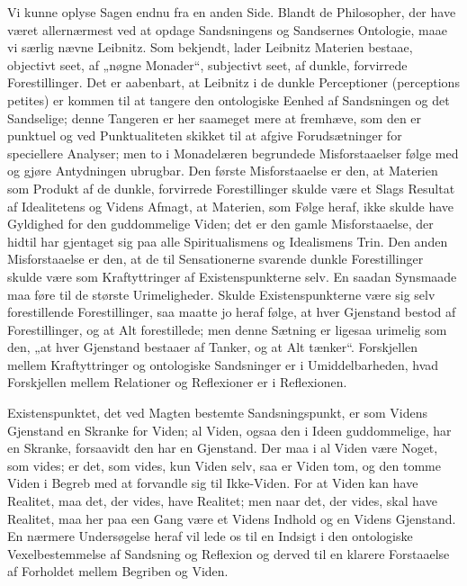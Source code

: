 \documentclass[12pt]{book}
\newcommand{\opage}[1]{\marginnote{\footnotesize\textit{[#1]}}}
\begin{document}
Vi kunne oplyse Sagen endnu fra en anden Side. Blandt de Philosopher, der have været allernærmest ved
at
\opage{259} opdage Sandsningens og Sandsernes Ontologie, maae vi særlig nævne Leibnitz. Som bekjendt, lader
Leibnitz Materien bestaae, objectivt seet, af „nøgne Monader“, subjectivt seet, af dunkle, forvirrede
Forestillinger. Det er aabenbart, at Leibnitz i de dunkle Perceptioner (perceptions petites) er kommen
til at tangere den ontologiske Eenhed af Sandsningen og det Sandselige; denne Tangeren er her saameget
mere at fremhæve, som den er punktuel og ved Punktualiteten skikket til at afgive Forudsætninger for
speciellere Analyser; men to i Monadelæren begrundede Misforstaaelser følge med og gjøre Antydningen
ubrugbar. Den første Misforstaaelse er den, at Materien som Produkt af de dunkle, forvirrede
Forestillinger skulde være et Slags Resultat af Idealitetens og Videns Afmagt, at Materien, som Følge
heraf, ikke skulde have Gyldighed for den guddommelige Viden; det er den gamle Misforstaaelse, der
hidtil har gjentaget sig paa alle Spiritualismens og Idealismens Trin. Den anden Misforstaaelse er
den, at de til Sensationerne svarende dunkle Forestillinger skulde være som Kraftyttringer af
Existenspunkterne selv. En saadan Synsmaade maa føre til de største Urimeligheder. Skulde
Existenspunkterne være sig selv forestillende Forestillinger, saa maatte jo heraf følge, at hver
Gjenstand bestod af Forestillinger, og at Alt forestillede; men denne Sætning er ligesaa urimelig som
den, „at hver Gjenstand bestaaer af Tanker, og at Alt tænker“. Forskjellen mellem Kraftyttringer og
ontologiske Sandsninger er i Umiddelbarheden, hvad Forskjellen mellem Relationer og Reflexioner er i
Reflexionen.

Existenspunktet, det ved Magten bestemte Sandsningspunkt, er som Videns Gjenstand en Skranke for Viden;
al Viden, ogsaa den i Ideen guddommelige, har en Skranke, forsaavidt den har en Gjenstand. Der maa i
al Viden være Noget, som vides; er det, som vides, kun Viden selv, saa er Viden tom, og den tomme Viden
i Begreb med at forvandle
\opage{260} sig til Ikke-Viden. For at Viden kan have Realitet, maa det, der vides, have Realitet; men naar det,
der vides, skal have Realitet, maa her paa een Gang være et Videns Indhold og en Videns Gjenstand. En
nærmere Undersøgelse heraf vil lede os til en Indsigt i den ontologiske Vexelbestemmelse af Sandsning
og Reflexion og derved til en klarere Forstaaelse af Forholdet mellem Begriben og Viden.
\end{document}
